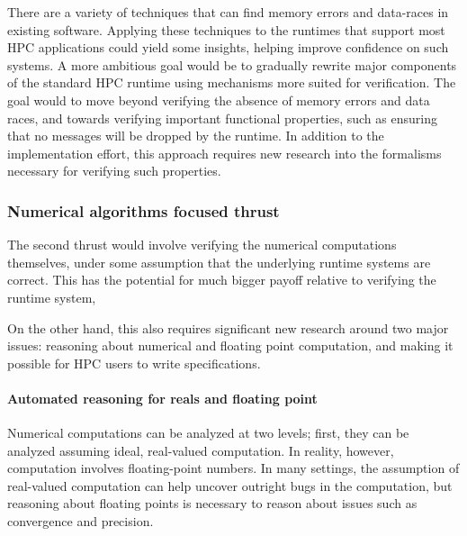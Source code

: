 There are a variety of techniques that can find memory errors and data-races in existing software. Applying these techniques to the runtimes that support most HPC applications could yield some insights, helping improve confidence on such systems. 
%
%
A more ambitious goal would be to gradually rewrite major components of the standard HPC runtime using mechanisms more suited for verification. The goal would to move beyond verifying  the absence of memory errors and data races, and towards verifying important functional properties, such as ensuring that no messages will be dropped by the runtime. In addition to the implementation effort, this approach requires new research into the formalisms necessary for verifying such properties. 



\subsubsection{Numerical algorithms focused thrust}
\label{subsec:numerical}

The second thrust would involve verifying the numerical computations themselves, under some assumption that the underlying runtime systems are correct. This has the potential for much bigger payoff relative to verifying the runtime system,  

On the other hand, this also requires significant new research around two major issues: reasoning about numerical and floating point computation, and making it possible for HPC users to write specifications. 


\paragraph{Automated reasoning for reals and floating point}

Numerical computations can be analyzed at two levels; first, they can be analyzed assuming ideal, real-valued computation. In reality, however, computation involves floating-point numbers. In many settings, the assumption of real-valued computation can help uncover outright bugs in the computation, but reasoning about floating points is necessary to reason about issues such as convergence and precision. 

